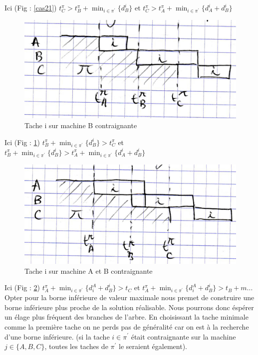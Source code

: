 \documentclass[12pt]{article}
\begin{document}
Ici (Fig : \ref{cas21}) $t_C^\pi > t_B^\pi + \displaystyle\min_{i \in \pi^\prime}\{d_B^i\}$ et $t_C^\pi > t_A^\pi + \displaystyle\min_{i \in \pi^\prime}\{d_A^i + d_B^i\}$

\begin{figure}[!ht]
\centering
\centerline{\includegraphics[scale=1]{8.jpg}}
\caption{Tache i sur machine B contraignante}
\label{cas22}
\end{figure}

Ici (Fig : \ref{cas22}) $t_B^\pi + \displaystyle\min_{i \in \pi^\prime}\{d_B^i\} > t_C^\pi$ et $t_B^\pi + \displaystyle\min_{i \in \pi^\prime}\{d_B^i\} > t_A^\pi + \displaystyle\min_{i \in \pi^\prime}\{d_A^i + d_B^i\}$


\begin{figure}[!ht]
\centering
\centerline{\includegraphics[scale=1]{9.jpg}}
\caption{Tache i sur machine A et B contraignante}
\label{cas23}
\end{figure}

Ici (Fig : \ref{cas23}) $t_A^\pi + \displaystyle\min_{i \in \pi^\prime}\{d_i^A + d_B^i\} > t_C$ et $t_A^\pi + \displaystyle\min_{i \in \pi^\prime}\{d_i^A + d_B^i\} > t_B + m...$ \\

Opter pour la borne inférieure de valeur maximale nous premet de construire une borne inférieure plus proche de la solution réalisable. Nous pourrons donc éspérer un élage plus fréquent des branches de l'arbre. En choisissant la tache minimale comme la première tache on ne perds pas de généralité car on est à la recherche d'une borne inférieure. (si la tache $i\in\pi^\prime$ était contraignante sur la machine $j\in\{A,B,C\}$, toutes les taches de $\pi^\prime$ le seraient également).
\end{document}
